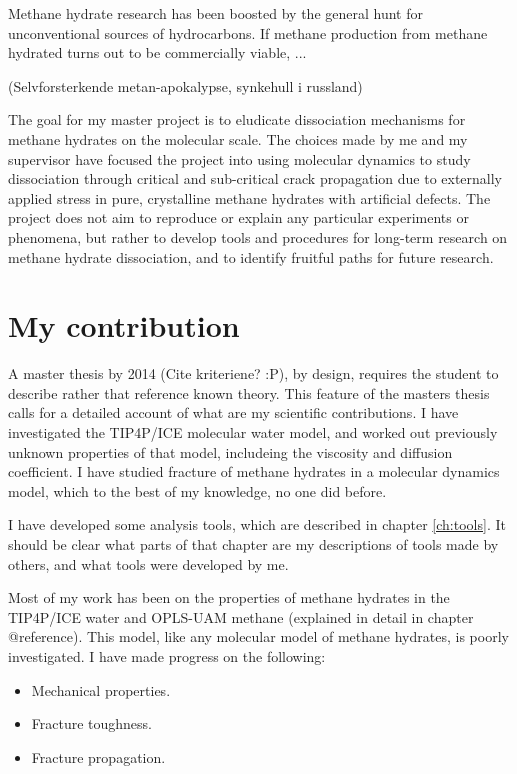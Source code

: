 Methane hydrate research has been boosted by the general hunt for unconventional sources of hydrocarbons. If methane production from methane hydrated turns out to be commercially viable, ...

(Selvforsterkende metan-apokalypse, synkehull i russland)

The goal for my master project is to eludicate dissociation mechanisms for methane hydrates on the molecular scale. The choices made by me and my supervisor have focused the project into using molecular dynamics to study dissociation through critical and sub-critical crack propagation due to externally applied stress in pure, crystalline methane hydrates with artificial defects. The project does not aim to reproduce or explain any particular experiments or phenomena, but rather to develop tools and procedures for long-term research on methane hydrate dissociation, and to identify fruitful paths for future research.


\section{My contribution}
A master thesis by 2014 (Cite kriteriene? :P), by design, requires the student to describe rather that reference known theory. This feature of the masters thesis calls for a detailed account of what are my scientific contributions. I have investigated the TIP4P/ICE molecular water model, and worked out previously unknown properties of that model, includeing the viscosity and diffusion coefficient. I have studied fracture of methane hydrates in a molecular dynamics model, which to the best of my knowledge, no one did before. 

I have developed some analysis tools, which are described in chapter \ref{ch:tools}. It should be clear what parts of that chapter are my descriptions of tools made by others, and what tools were developed by me.

Most of my work has been on the properties of methane hydrates in the  TIP4P/ICE water and OPLS-UAM methane (explained in detail in chapter @reference). This model, like any molecular model of methane hydrates, is poorly investigated. I have made progress on the following:
\begin{itemize}
\item Mechanical properties.
\item Fracture toughness.
\item Fracture propagation.
\end{itemize}


